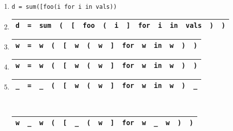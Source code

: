 \documentclass[runningheads]{llncs}
\begin{document}
\begin{enumerate}[leftmargin=.23\linewidth]
  \item \texttt{d = sum([foo(i\err{]} for i in vals))}
  \item \begin{tabular}{|c|c|c|c|c|c|c|c|c|c|c|c|c|c|c|}
          \hline
          \texttt{d} & \texttt{=} & \texttt{sum} & \texttt{(} & \texttt{[} & \texttt{foo} & \texttt{(} & \texttt{i} & \texttt{]} & \texttt{for} & \texttt{i} & \texttt{in} & \texttt{vals} & \texttt{)} & \texttt{)} \\\hline
  \end{tabular}
  \item \begin{tabular}{|c|c|c|c|c|c|c|c|c|c|c|c|c|c|c|}
          \hline
          \texttt{w} & \texttt{=} & \texttt{w} & \texttt{(} & \texttt{[} & \texttt{w} & \texttt{(} & \texttt{w} & \texttt{]} & \texttt{for} & \texttt{w} & \texttt{in} & \texttt{w} & \texttt{)} & \texttt{)} \\\hline
  \end{tabular}
  \item \begin{tabular}{|||c|||c|||c|||c|||c|||c|||c|||c|||c|||c|||c|||c|||c|||c|||c|||}
          \hline
          \texttt{w} & \texttt{=} & \texttt{w} & \texttt{(} & \texttt{[} & \texttt{w} & \texttt{(} & \texttt{w} & \texttt{]} & \texttt{for} & \texttt{w} & \texttt{in} & \texttt{w} & \texttt{)} & \texttt{)} \\\hline
  \end{tabular}
  \item \begin{tabular}{|||c|||c|||c|||c|||c|||c|||c|||c|||c|||c|||c|||c|||c|||c|||c|||}
          \hline
          \cellcolor{black!15}\texttt{\_} & \texttt{=} & \cellcolor{black!15}\texttt{\_} & \texttt{(} & \texttt{[} & \texttt{w} & \texttt{(} & \texttt{w} & \texttt{]} & \texttt{for} & \texttt{w} & \texttt{in} & \texttt{w} & \texttt{)} & \cellcolor{black!15}\texttt{\_} \\\hline
  \end{tabular}\\
  \begin{tabular}{|||c|||c|||c|||c|||c|||c|||c|||c|||c|||c|||c|||c|||c|||c|||c|||}
    \hline
    \texttt{w} & \cellcolor{black!15}\texttt{\_} & \texttt{w} & \texttt{(} & \texttt{[} & \cellcolor{black!15}\texttt{\_} & \texttt{(} & \texttt{w} & \texttt{]} & \texttt{for} & \texttt{w} & \cellcolor{black!15}\texttt{\_} & \texttt{w} & \texttt{)} & \texttt{)} \\\hline

\end{tabular}
\end{enumerate}
\end{document}
